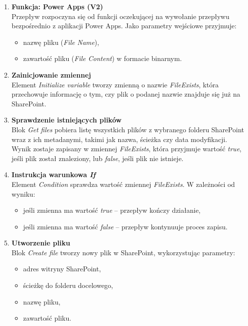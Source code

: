 \begin{enumerate}
    \item \textbf{Funkcja: Power Apps (V2)} \\
          Przepływ rozpoczyna się od funkcji oczekującej na wywołanie przepływu bezpośrednio z aplikacji Power Apps. Jako parametry wejściowe przyjmuje:
          \begin{itemize}
              \item nazwę pliku (\emph{File Name}),
              \item zawartość pliku (\emph{File Content}) w formacie binarnym.
          \end{itemize}

    \item \textbf{Zainicjowanie zmiennej} \\
          Element \emph{Initialize variable} tworzy zmienną o nazwie \emph{FileExists}, która przechowuje informację o tym, czy plik o podanej nazwie znajduje się już na SharePoint.

    \item \textbf{Sprawdzenie istniejących plików} \\
          Blok \emph{Get files} pobiera listę wszystkich plików z wybranego folderu SharePoint wraz z ich metadanymi, takimi jak nazwa, ścieżka czy data modyfikacji. Wynik zostaje zapisany w zmiennej \emph{FileExists}, która przyjmuje wartość \emph{true}, jeśli plik został znaleziony, lub \emph{false}, jeśli plik nie istnieje.

    \item \textbf{Instrukcja warunkowa \emph{If}} \\
          Element \emph{Condition} sprawdza wartość zmiennej \emph{FileExists}. W zależności od wyniku:
          \begin{itemize}
              \item jeśli zmienna ma wartość \emph{true} -- przepływ kończy działanie,
              \item jeśli zmienna ma wartość \emph{false} -- przepływ kontynuuje proces zapisu.
          \end{itemize}

    \item \textbf{Utworzenie pliku} \\
          Blok \emph{Create file} tworzy nowy plik w SharePoint, wykorzystując parametry:
          \begin{itemize}
              \item adres witryny SharePoint,
              \item ścieżkę do folderu docelowego,
              \item nazwę pliku,
              \item zawartość pliku.
          \end{itemize}


\end{enumerate}
